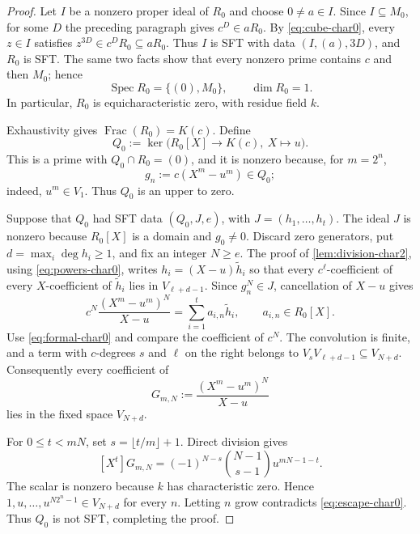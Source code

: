 \documentclass[10pt,a4paper]{amsart}
\newcommand{\Frac}{\operatorname{Frac}}
\newcommand{\Spec}{\operatorname{Spec}}
\begin{document}
\begin{proof}
Let $I$ be a nonzero proper ideal of $R_0$ and choose $0\neq a\in I$.
Since $I\subseteq M_0$, for some $D$ the preceding paragraph gives
$c^D\in aR_0$.  By
\eqref{eq:cube-char0}, every $z\in I$ satisfies
$z^{3D}\in c^DR_0\subseteq aR_0$.  Thus $I$ is SFT with data
$(I,(a),3D)$, and $R_0$ is SFT.  The same two facts show that every nonzero
prime contains $c$ and then $M_0$; hence
\[
  \Spec R_0=\{(0),M_0\},\qquad \dim R_0=1.
\]
In particular, $R_0$ is equicharacteristic zero, with residue field $k$.

Exhaustivity gives $\Frac(R_0)=K(c)$.  Define
\[
 Q_0:=\ker\bigl(R_0[X]\longrightarrow K(c),\ X\longmapsto u\bigr).
\]
This is a prime with $Q_0\cap R_0=(0)$, and it is nonzero because, for
$m=2^n$,
\begin{equation}\label{eq:gn-char0}
  g_n:=c(X^m-u^m)\in Q_0;
\end{equation}
indeed, $u^m\in V_1$.  Thus $Q_0$ is an upper to zero.

Suppose that $Q_0$ had SFT data $(Q_0,J,e)$, with
$J=(h_1,\ldots,h_t)$.  The ideal $J$ is nonzero because $R_0[X]$ is a
domain and $g_0\neq0$.  Discard zero generators, put
$d=\max_i\deg h_i\geq1$, and fix an integer $N\geq e$.  The proof of
\cref{lem:division-char2}, using \eqref{eq:powers-char0}, writes
$h_i=(X-u)\widetilde h_i$ so that every $c^\ell$-coefficient of every
$X$-coefficient of $\widetilde h_i$ lies in $V_{\ell+d-1}$.
Since $g_n^N\in J$, cancellation of $X-u$ gives
\begin{equation}\label{eq:cancelled-char0}
 c^N\frac{(X^m-u^m)^N}{X-u}
   =\sum_{i=1}^ta_{i,n}\widetilde h_i,
  \qquad a_{i,n}\in R_0[X].
\end{equation}
Use \eqref{eq:formal-char0} and compare the coefficient of $c^N$.
The convolution is finite, and a term with $c$-degrees $s$ and $\ell$ on
the right belongs to $V_sV_{\ell+d-1}\subseteq V_{N+d}$.  Consequently
every coefficient of
\[
  G_{m,N}:=\frac{(X^m-u^m)^N}{X-u}
\]
lies in the fixed space $V_{N+d}$.

For $0\leq t<mN$, set $s=\lfloor t/m\rfloor+1$.  Direct division gives
\begin{equation}\label{eq:coefficients-char0}
 [X^t]G_{m,N}
  =(-1)^{N-s}\binom{N-1}{s-1}u^{mN-1-t}.
\end{equation}
The scalar is nonzero because $k$ has characteristic zero.  Hence
$1,u,\ldots,u^{N2^n-1}\in V_{N+d}$ for every $n$.  Letting $n$ grow
contradicts \eqref{eq:escape-char0}.  Thus $Q_0$ is not SFT, completing
the proof.
\end{proof}
\end{document}
